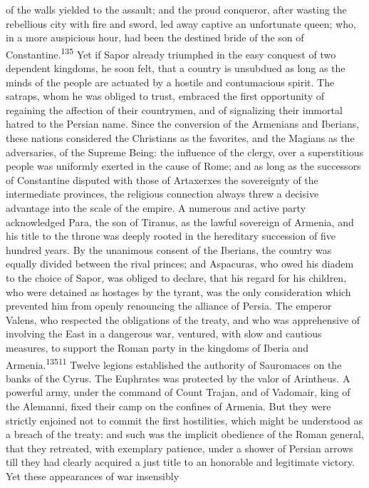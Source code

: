 of the walls yielded to the assault; and the proud conqueror,
after wasting the rebellious city with fire and sword, led away
captive an unfortunate queen; who, in a more auspicious hour, had
been the destined bride of the son of Constantine.\textsuperscript{135} Yet if
Sapor already triumphed in the easy conquest of two dependent
kingdoms, he soon felt, that a country is unsubdued as long as
the minds of the people are actuated by a hostile and
contumacious spirit. The satraps, whom he was obliged to trust,
embraced the first opportunity of regaining the affection of
their countrymen, and of signalizing their immortal hatred to the
Persian name. Since the conversion of the Armenians and Iberians,
these nations considered the Christians as the favorites, and the
Magians as the adversaries, of the Supreme Being: the influence
of the clergy, over a superstitious people was uniformly exerted
in the cause of Rome; and as long as the successors of
Constantine disputed with those of Artaxerxes the sovereignty of
the intermediate provinces, the religious connection always threw
a decisive advantage into the scale of the empire. A numerous and
active party acknowledged Para, the son of Tiranus, as the lawful
sovereign of Armenia, and his title to the throne was deeply
rooted in the hereditary succession of five hundred years. By the
unanimous consent of the Iberians, the country was equally
divided between the rival princes; and Aspacuras, who owed his
diadem to the choice of Sapor, was obliged to declare, that his
regard for his children, who were detained as hostages by the
tyrant, was the only consideration which prevented him from
openly renouncing the alliance of Persia. The emperor Valens, who
respected the obligations of the treaty, and who was apprehensive
of involving the East in a dangerous war, ventured, with slow and
cautious measures, to support the Roman party in the kingdoms of
Iberia and Armenia.\textsuperscript{13511} Twelve legions established the
authority of Sauromaces on the banks of the Cyrus. The Euphrates
was protected by the valor of Arintheus. A powerful army, under
the command of Count Trajan, and of Vadomair, king of the
Alemanni, fixed their camp on the confines of Armenia. But they
were strictly enjoined not to commit the first hostilities, which
might be understood as a breach of the treaty: and such was the
implicit obedience of the Roman general, that they retreated,
with exemplary patience, under a shower of Persian arrows till
they had clearly acquired a just title to an honorable and
legitimate victory. Yet these appearances of war insensibly

